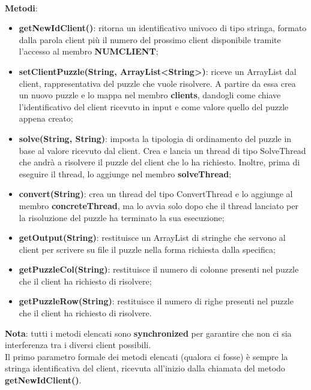 		\noindent \\
		\textbf{Metodi}:
			\begin{itemize}
				\item \textbf{getNewIdClient()}: ritorna un identificativo univoco di tipo stringa, formato dalla parola client più il numero del prossimo client disponibile tramite l'accesso al membro \textbf{NUMCLIENT};
				\item \textbf{setClientPuzzle(String, ArrayList<String>)}: riceve un ArrayList dal client, rappresentativa del puzzle che vuole risolvere. A partire da essa crea un nuovo puzzle e lo mappa nel membro \textbf{clients}, dandogli come chiave l'identificativo del client ricevuto in input e come valore quello del puzzle appena creato;
				\item \textbf{solve(String, String)}: imposta la tipologia di ordinamento del puzzle in base al valore ricevuto dal client. Crea e lancia un thread di tipo SolveThread che andrà a risolvere il puzzle del client che lo ha richiesto. Inoltre, prima di eseguire il thread, lo aggiunge nel membro \textbf{solveThread};
				\item \textbf{convert(String)}: crea un thread del tipo ConvertThread e lo aggiunge al membro \textbf{concreteThread}, ma lo avvia solo dopo che il thread lanciato per la risoluzione del puzzle ha terminato la sua esecuzione;
				\item \textbf{getOutput(String)}: restituisce un ArrayList di stringhe che servono al client per scrivere su file il puzzle nella forma richiesta dalla specifica;
				\item \textbf{getPuzzleCol(String)}: restituisce il numero di colonne presenti nel puzzle che il client ha richiesto di risolvere;
				\item \textbf{getPuzzleRow(String)}: restituisce il numero di righe presenti nel puzzle che il client ha richiesto di risolvere.
			\end{itemize}
		\noindent
		\textbf{Nota}: tutti i metodi elencati sono \textbf{synchronized} per garantire che non ci sia interferenza tra i diversi client possibili. \\
		Il primo parametro formale dei metodi elencati (qualora ci fosse) è sempre la stringa identificativa del client, ricevuta all'inizio dalla chiamata del metodo \textbf{getNewIdClient()}.
		
